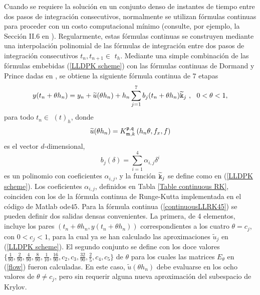 Cuando se requiere la solución en un conjunto denso de instantes de tiempo entre dos pasos de integración consecutivos, normalmente se utilizan fórmulas continuas para proceder con un costo computacional mínimo (consulte, por ejemplo, la Sección II.6 en \cite{hairer1993solving}). Regularmente, estas fórmulas continuas se construyen mediante una interpolación polinomial de las fórmulas de integración entre dos pasos de integración consecutivos $t_{n},t_{n+1}\in $ $ t_{h}$. Mediante una simple combinación de las fórmulas embebidas (\ref{LLDPK scheme}) con las fórmulas continuas de Dormand y Prince dadas en \cite{hairer1993solving}, se obtiene la siguiente fórmula continua de $7$ etapas
\begin{equation}
    y(t_{n}+\theta h_{n})=y_n+\widetilde{u}(\theta
    h_{n})+h_{n}\sum_{j=1}^{7}b_{j}(t_{n}+\theta h_{n})\widetilde{\mathtt{k}}_{j}\
    ,\ \ 0<\theta <1,  \label{continuousLLRK45}
\end{equation}%
 para todo $t_{n} \in $ $\left( t\right) _{h}$, donde
\begin{equation*}
    \widetilde{u}(\theta h_{n}) = K_{\mathfrak{m},k}^{\mathfrak{p},\mathfrak{q}}\left(h_n\theta, f_x , f \right)
\end{equation*}
    es el vector $d$-dimensional,
\begin{equation*}
    b_{j}(\delta )=\sum\limits_{i=1}^{4}\alpha _{i,j}\delta ^{i}
\end{equation*}
es un polinomio con coeficientes $\alpha _{i,j}$, y la función $\widetilde{\mathtt{k}}_{j}$ se define como en (\ref{LLDPK scheme}). Los coeficientes $\alpha _{i,j}$, definidos en
Tabla \ref{Table continuous RK}, coinciden con los de la
fórmula continua de Runge-Kutta implementada en el código de Matlab ode$45$. Para la fórmula continua (\ref{continuousLLRK45}) se pueden definir dos salidas densas convenientes. La primera, de 4 elementos, incluye los pares $(t_{n}+\theta h_{n},y(t_{n}+\theta h_{n}))$ correspondientes a los cuatro $\theta = c_j $, con $0<c_j<1$, para la cual ya se han calculado las aproximaciones $\widetilde{u}_j$ en (\ref{LLDPK scheme}). El segundo conjunto se define con los doce valores
$\{\frac{1}{90},\frac{2}{90},\frac{4}{90},\frac{8}{90},\frac{1}{10},\frac {16}{90},c_2,c_3,\frac{32}{90},\frac{2}{5},c_4,c_5\}$ de $\theta$ para los cuales las matrices $E_\theta$ en (\ref{flow}) fueron calculadas. En este caso, $\widetilde{u}(\theta h_{n})$ debe evaluarse en los ocho valores de $\theta \ne c_j$, pero sin requerir alguna nueva aproximación del subespacio de Krylov.

